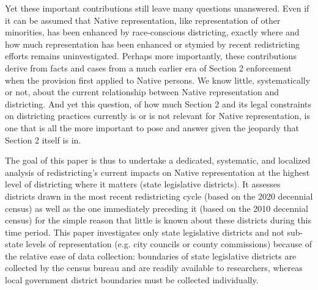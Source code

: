 \documentclass[12pt]{article}
\begin{document}
Yet these important contributions still leave many questions unanswered. Even if it can be assumed that Native representation, like representation of other minorities, has been enhanced by race-conscious districting, exactly where and how much representation has been enhanced or stymied by recent redistricting efforts remains uninvestigated. Perhaps more importantly, these contributions derive from facts and cases from a much earlier era of Section 2 enforcement when the provision first applied to Native persons. We know little, systematically or not, about the current relationship between Native representation and districting. And yet this question, of how much Section 2 and its legal constraints on districting practices currently is or is not relevant for Native representation, is one that is all the more important to pose and answer given the jeopardy that Section 2 itself is in.

The goal of this paper is thus to undertake a dedicated, systematic, and localized analysis of redistricting's current impacts on Native representation at the highest level of districting where it matters (state legislative districts). It assesses districts drawn in the most recent redistricting cycle (based on the 2020 decennial census) as well as the one immediately preceding it (based on the 2010 decennial census) for the simple reason that little is known about these districts during this time period. This paper investigates only state legislative districts and not sub-state levels of representation (e.g. city councils or county commissions) because of the relative ease of data collection: boundaries of state legislative districts are collected by the census bureau and are readily available to researchers, whereas local government district boundaries must be collected individually.
\end{document}
